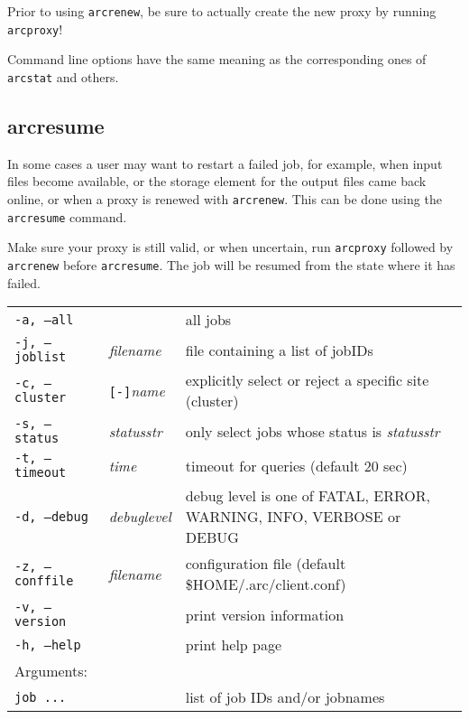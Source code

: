 \begin{framed}
 Prior to using \texttt{arcrenew}, be sure to actually create the
new proxy by running \verb#arcproxy#!
\end{framed}

Command line options have the same meaning as the corresponding ones of \verb#arcstat# and others.


\subsection{arcresume}
\label{sec:arcresume}

In some cases a user may want to restart a failed job, for example, when input
files become available, or the storage element for the output files came back
online, or when a proxy is renewed with \texttt{arcrenew}. This can be done using
the \texttt{arcresume} command.

\begin{framed}
Make sure your proxy is still valid, or when uncertain, run \verb#arcproxy# followed by
\verb#arcrenew# before \verb#arcresume#. The job will be resumed from the state where it has failed.
\end{framed}

\hspace*{0.5cm}
\begin{shaded}
\end{shaded}
\begin{longtable}{llp{8cm}}
   \texttt{-a, --all}& & all jobs\\
   \texttt{-j, --joblist}& \textit{filename} & file containing a list of jobIDs\\
   \texttt{-c, --cluster}&\verb#[-]#\textit{name}&explicitly select or reject a specific site (cluster)\\
   \texttt{-s, --status}& \textit{statusstr} &only select jobs whose status is \textit{statusstr}\\
   \texttt{-t, --timeout}& \textit{time} & timeout for queries (default 20 sec)\\
   \texttt{-d, --debug}& \textit{debuglevel}&debug level is one of  FATAL, ERROR, WARNING, INFO, VERBOSE or DEBUG\\
   \texttt{-z, --conffile}&\textit{filename}& configuration file (default {\$}HOME/.arc/client.conf)\\
   \texttt{-v, --version}& & print version information\\
   \texttt{-h, --help}& & print help page\\
   Arguments:&&\\
   \texttt{job ...} && list of job IDs and/or jobnames\\
\end{longtable}


